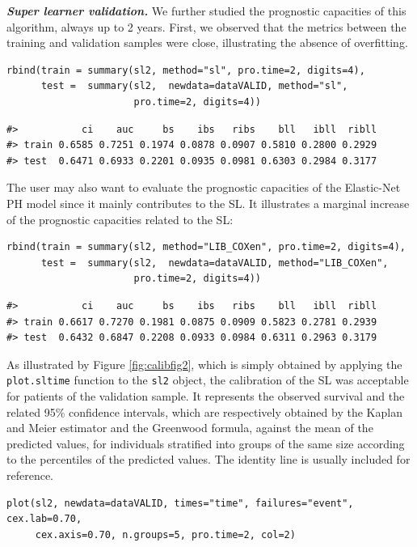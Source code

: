 \textbf{\textit{Super learner validation.}} We further studied the prognostic capacities of this algorithm, always up to 2 years. First, we observed that the metrics between the training and validation samples were close, illustrating the absence of overfitting.

\begin{verbatim}
rbind(train = summary(sl2, method="sl", pro.time=2, digits=4),
      test =  summary(sl2,  newdata=dataVALID, method="sl",
                      pro.time=2, digits=4))
\end{verbatim}

\begin{verbatim}
#>           ci    auc     bs    ibs   ribs    bll   ibll  ribll
#> train 0.6585 0.7251 0.1974 0.0878 0.0907 0.5810 0.2800 0.2929
#> test  0.6471 0.6933 0.2201 0.0935 0.0981 0.6303 0.2984 0.3177
\end{verbatim}

The user may also want to evaluate the prognostic capacities of the Elastic-Net PH model since it mainly contributes to the SL. It illustrates a marginal increase of the prognostic capacities related to the SL:

\begin{verbatim}
rbind(train = summary(sl2, method="LIB_COXen", pro.time=2, digits=4),
      test =  summary(sl2,  newdata=dataVALID, method="LIB_COXen",
                      pro.time=2, digits=4))
\end{verbatim}

\begin{verbatim}
#>           ci    auc     bs    ibs   ribs    bll   ibll  ribll
#> train 0.6617 0.7270 0.1981 0.0875 0.0909 0.5823 0.2781 0.2939
#> test  0.6432 0.6847 0.2208 0.0933 0.0984 0.6311 0.2963 0.3179
\end{verbatim}

As illustrated by Figure \ref{fig:calibfig2}, which is simply obtained by applying the \texttt{plot.sltime} function to the \texttt{sl2} object, the calibration of the SL was acceptable for patients of the validation sample. It represents the observed survival and the related 95\% confidence intervals, which are respectively obtained by the Kaplan and Meier estimator and the Greenwood formula, against the mean of the predicted values, for individuals stratified into groups of the same size according to the percentiles of the predicted values. The identity line is usually included for reference.

\begin{verbatim}
plot(sl2, newdata=dataVALID, times="time", failures="event", cex.lab=0.70,
     cex.axis=0.70, n.groups=5, pro.time=2, col=2)
\end{verbatim}

